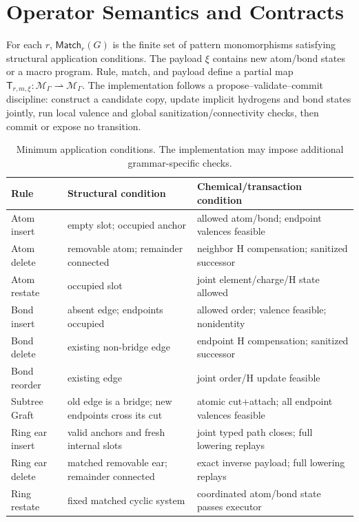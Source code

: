 \documentclass{article}
\newcommand{\M}{\mathcal{M}_{\Gamma}}
\newcommand{\T}{\mathsf{T}}
\newcommand{\Match}{\mathsf{Match}}
\theoremstyle{definition}
\theoremstyle{remark}
\begin{document}



\appendix

\section{Operator Semantics and Contracts}\label{app:operators}

For each $r$, $\Match_r(G)$ is the finite set of pattern monomorphisms satisfying structural application conditions. The payload $\xi$ contains new atom/bond states or a macro program. Rule, match, and payload define a partial map $\T_{r,m,\xi}:\M\rightharpoonup\M$. The implementation follows a propose--validate--commit discipline: construct a candidate copy, update implicit hydrogens and bond states jointly, run local valence and global sanitization/connectivity checks, then commit or expose no transition.

\begin{table}[h]
\centering
\caption{Minimum application conditions. The implementation may impose additional grammar-specific checks.}
\small
\begin{tabularx}{\textwidth}{lX X}
\toprule
Rule & Structural condition & Chemical/transaction condition\\
\midrule
Atom insert & empty slot; occupied anchor & allowed atom/bond; endpoint valences feasible\\
Atom delete & removable atom; remainder connected & neighbor H compensation; sanitized successor\\
Atom restate & occupied slot & joint element/charge/H state allowed\\
Bond insert & absent edge; endpoints occupied & allowed order; valence feasible; nonidentity\\
Bond delete & existing non-bridge edge & endpoint H compensation; sanitized successor\\
Bond reorder & existing edge & joint order/H update feasible\\
Subtree Graft & old edge is a bridge; new endpoints cross its cut & atomic cut+attach; all endpoint valences feasible\\
Ring ear insert & valid anchors and fresh internal slots & joint typed path closes; full lowering replays\\
Ring ear delete & matched removable ear; remainder connected & exact inverse payload; full lowering replays\\
Ring restate & fixed matched cyclic system & coordinated atom/bond state passes executor\\
\bottomrule
\end{tabularx}
\end{table}
\end{document}
